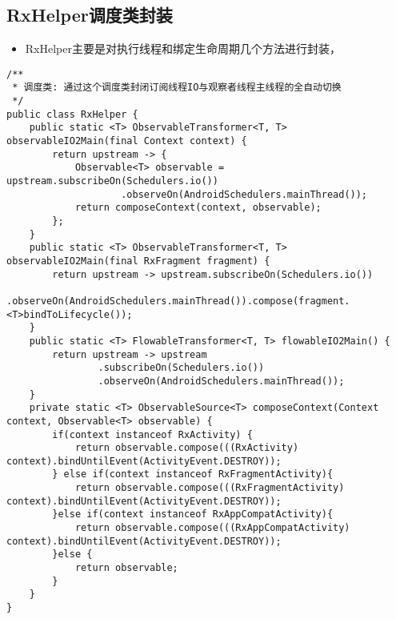 \documentclass[9pt, b5paper]{article}
\begin{document}
\subsection{RxHelper调度类封装}
\label{sec-18-2}
\begin{itemize}
\item RxHelper主要是对执行线程和绑定生命周期几个方法进行封装，
\end{itemize}
\begin{verbatim}
/**
 * 调度类: 通过这个调度类封闭订阅线程IO与观察者线程主线程的全自动切换
 */
public class RxHelper {
    public static <T> ObservableTransformer<T, T> observableIO2Main(final Context context) {
        return upstream -> {
            Observable<T> observable = upstream.subscribeOn(Schedulers.io())
                    .observeOn(AndroidSchedulers.mainThread());
            return composeContext(context, observable);
        };
    }
    public static <T> ObservableTransformer<T, T> observableIO2Main(final RxFragment fragment) {
        return upstream -> upstream.subscribeOn(Schedulers.io())
                .observeOn(AndroidSchedulers.mainThread()).compose(fragment.<T>bindToLifecycle());
    }
    public static <T> FlowableTransformer<T, T> flowableIO2Main() {
        return upstream -> upstream
                .subscribeOn(Schedulers.io())
                .observeOn(AndroidSchedulers.mainThread());
    }
    private static <T> ObservableSource<T> composeContext(Context context, Observable<T> observable) {
        if(context instanceof RxActivity) {
            return observable.compose(((RxActivity) context).bindUntilEvent(ActivityEvent.DESTROY));
        } else if(context instanceof RxFragmentActivity){
            return observable.compose(((RxFragmentActivity) context).bindUntilEvent(ActivityEvent.DESTROY));
        }else if(context instanceof RxAppCompatActivity){
            return observable.compose(((RxAppCompatActivity) context).bindUntilEvent(ActivityEvent.DESTROY));
        }else {
            return observable;
        }
    }
}
\end{verbatim}
\end{document}
